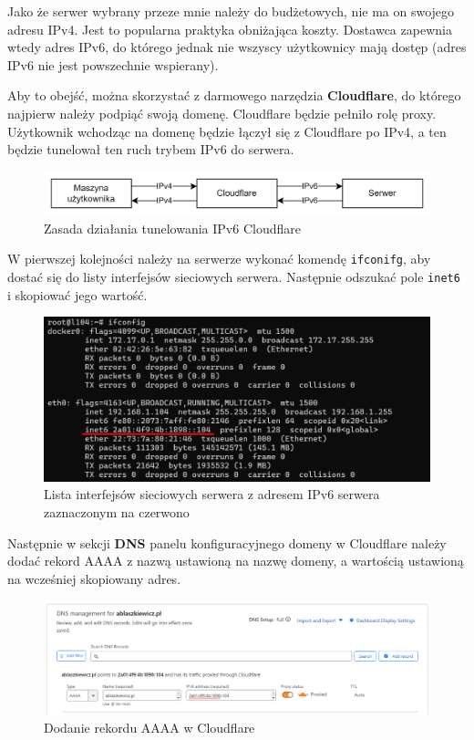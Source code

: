 \documentclass{article}
\begin{document}
Jako że serwer wybrany przeze mnie należy do budżetowych, nie ma on swojego adresu IPv4. Jest to popularna praktyka obniżająca koszty. Dostawca zapewnia wtedy adres IPv6, do którego jednak nie wszyscy użytkownicy mają dostęp (adres IPv6 nie jest powszechnie wspierany).

Aby to obejść, można skorzystać z darmowego narzędzia \textbf{Cloudflare}, do którego najpierw należy podpiąć swoją domenę. Cloudflare będzie pełniło rolę proxy. Użytkownik wchodząc na domenę będzie łączył się z Cloudflare po IPv4, a ten będzie tunelował ten ruch trybem IPv6 do serwera.

\begin{figure}[H]
    \centering
    \includegraphics[width=1\linewidth]{ipv6diagram.png}
    \caption{Zasada działania tunelowania IPv6 Cloudflare}
    \label{fig:enter-label}
\end{figure}

W pierwszej kolejności należy na serwerze wykonać komendę \lstinline|ifconifg|, aby dostać się do listy interfejsów sieciowych serwera. Następnie odszukać pole \lstinline|inet6| i skopiować jego wartość.

\begin{figure}[H]
    \centering
    \includegraphics[width=1\linewidth]{ipv6server.png}
    \caption{Lista interfejsów sieciowych serwera z adresem IPv6 serwera zaznaczonym na czerwono}
    \label{fig:enter-label}
\end{figure}

Następnie w sekcji \textbf{DNS} panelu konfiguracyjnego domeny w Cloudflare należy dodać rekord AAAA z nazwą ustawioną na nazwę domeny, a wartością ustawioną na wcześniej skopiowany adres.

\begin{figure}[H]
    \centering
    \includegraphics[width=1\linewidth]{ipv6cloudflare.png}
    \caption{Dodanie rekordu AAAA w Cloudflare}
    \label{fig:enter-label}
\end{figure}
\end{document}

